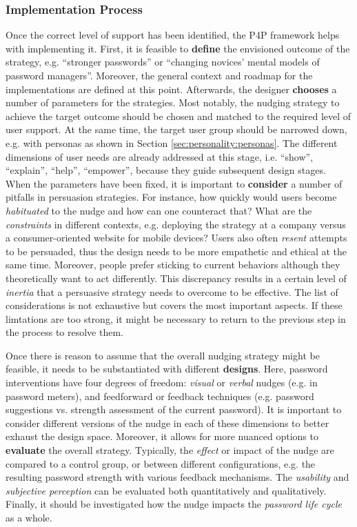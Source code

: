 \subsubsection{Implementation Process} Once the correct level of support has been identified, the P4P framework helps with implementing it. First, it is feasible to \textbf{define} the envisioned outcome of the strategy, e.g. ``stronger passwords'' or ``changing novices' mental models of password managers''. Moreover, the general context and roadmap for the implementations are defined at this point. Afterwards, the designer \textbf{chooses} a number of parameters for the strategies. Most notably, the nudging strategy to achieve the target outcome should be chosen and matched to the required level of user support. At the same time, the target user group should be narrowed down, e.g. with \glspl{persona} as shown in Section \ref{sec:personality:personas}. The different dimensions of user needs are already addressed at this stage, i.e. ``show'', ``explain'', ``help'', ``empower'', because they guide subsequent design stages. When the parameters have been fixed, it is important to \textbf{consider} a number of pitfalls in persuasion strategies. For instance, how quickly would users become \textit{habituated} to the nudge and how can one counteract that? What are the \textit{constraints} in different contexts, e.g. deploying the strategy at a company versus a consumer-oriented website for mobile devices? Users also often \textit{resent} attempts to be persuaded, thus the design needs to be more empathetic and ethical at the same time. Moreover, people prefer sticking to current behaviors although they theoretically want to act differently. This discrepancy results in a certain level of \textit{inertia} that a persuasive strategy needs to overcome to be effective. The list of considerations is not exhaustive but covers the most important aspects. If these limtations are too strong, it might be necessary to return to the previous step in the process to resolve them. 

Once there is reason to assume that the overall nudging strategy might be feasible, it needs to be substantiated with different \textbf{designs}. Here, password interventions have four degrees of freedom: \textit{visual} or \textit{verbal} nudges (e.g. in password meters), and feedforward or feedback techniques (e.g. password suggestions vs. strength assessment of the current password). It is important to consider different versions of the nudge in each of these dimensions to better exhaust the design space. Moreover, it allows for more nuanced options to \textbf{evaluate} the overall strategy. Typically, the \textit{effect} or impact of the nudge are compared to a control group, or between different configurations, e.g. the resulting password strength with various feedback mechanisms. The \textit{usability} and \textit{subjective perception} can be evaluated both quantitatively and qualitatively. Finally, it should be investigated how the nudge impacts the \textit{password life cycle} as a whole. 

